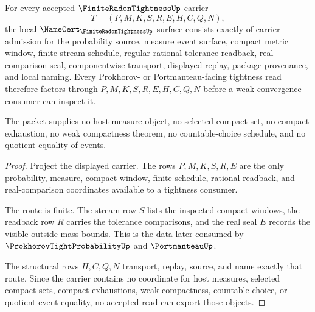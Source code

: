 \begin{theorem}
\label{thm:finite-radon-tightness-namecert-obligations}
For every accepted $\FiniteRadonTightnessUp$ carrier
$$
T=(P,M,K,S,R,E,H,C,Q,N),
$$
the local $\NameCert_{\FiniteRadonTightnessUp}$ surface consists exactly of carrier admission for the probability source, measure event surface, compact metric window, finite stream schedule, regular rational tolerance readback, real comparison seal, componentwise transport, displayed replay, package provenance, and local naming. Every Prokhorov- or Portmanteau-facing tightness read therefore factors through $P,M,K,S,R,E,H,C,Q,N$ before a weak-convergence consumer can inspect it.

The packet supplies no host measure object, no selected compact set, no compact exhaustion, no weak compactness theorem, no countable-choice schedule, and no quotient equality of events.
\end{theorem}
\begin{proof}
Project the displayed carrier. The rows $P,M,K,S,R,E$ are the only probability, measure, compact-window, finite-schedule, rational-readback, and real-comparison coordinates available to a tightness consumer.

The route is finite. The stream row $S$ lists the inspected compact windows, the readback row $R$ carries the tolerance comparisons, and the real seal $E$ records the visible outside-mass bounds. This is the data later consumed by $\ProkhorovTightProbabilityUp$ and $\PortmanteauUp$.

The structural rows $H,C,Q,N$ transport, replay, source, and name exactly that route. Since the carrier contains no coordinate for host measures, selected compact sets, compact exhaustions, weak compactness, countable choice, or quotient event equality, no accepted read can export those objects.
\end{proof}



